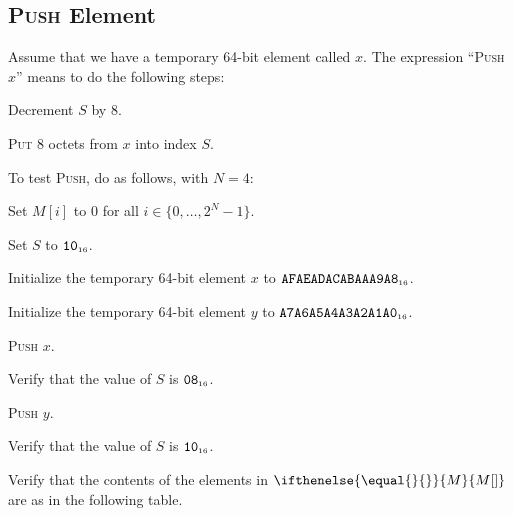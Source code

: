 \documentclass[a4paper,12pt]{article}
\newcommand{\num}[1]{\texttt{#1}}
\newcommand{\hex}[1]{\num{#1}_{\textup{\tiny 16}}}
\newcommand{\MEM}[1]{\ifthenelse{\equal{#1}{}}{M}{M[#1]}}
\newcommand{\SP}{S}
\newcommand{\range}[2]{\{#1,\ldots,#2\}}
\newcommand{\proc}[1]{\textsc{#1}}
\begin{document}
\subsection{\proc{Push} Element}

Assume that we have a temporary 64-bit element called $x$.
The expression ``\proc{Push} $x$'' means to do the following steps:
\begin{stepnumbers}
\item Decrement $\SP$ by 8.
\item \proc{Put} 8 octets from $x$ into index $\SP$.
\end{stepnumbers}

To test \proc{Push}, do as follows, with $N=4$:
\begin{stepnumbers}
\item Set $M[i]$ to 0 for all $i \in \range{0}{2^N-1}$.
\item Set $\SP$ to $\hex{10}$.
\item Initialize the temporary 64-bit element $x$ to $\hex{AFAEADACABAAA9A8}$.
\item Initialize the temporary 64-bit element $y$ to $\hex{A7A6A5A4A3A2A1A0}$.
\item \proc{Push} $x$.
\item Verify that the value of $\SP$ is $\hex{08}$.
\item \proc{Push} $y$.
\item Verify that the value of $\SP$ is $\hex{10}$.
\item Verify that the contents of the elements in $\MEM{}$ are as in the following table.
\end{stepnumbers}
\end{document}
